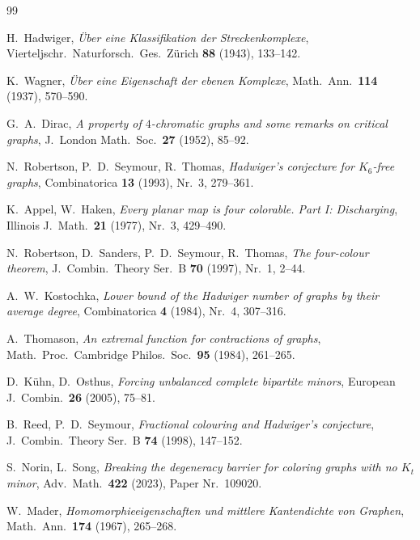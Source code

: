 \documentclass[12pt,a4paper]{amsart}
\theoremstyle{definition}
\theoremstyle{remark}
\begin{document}
\begin{thebibliography}{99}

H.~Hadwiger,
\textit{Über eine Klassifikation der Streckenkomplexe},
Vierteljschr.\ Naturforsch.\ Ges.\ Zürich \textbf{88} (1943), 133--142.

K.~Wagner,
\textit{Über eine Eigenschaft der ebenen Komplexe},
Math.\ Ann.\ \textbf{114} (1937), 570--590.

G.~A.\ Dirac,
\textit{A property of $4$-chromatic graphs and some remarks on critical graphs},
J.\ London Math.\ Soc.\ \textbf{27} (1952), 85--92.

N.~Robertson, P.~D.\ Seymour, R.~Thomas,
\textit{Hadwiger's conjecture for $K_6$-free graphs},
Combinatorica \textbf{13} (1993), Nr.\ 3, 279--361.

K.~Appel, W.~Haken,
\textit{Every planar map is four colorable. Part I: Discharging},
Illinois J.\ Math.\ \textbf{21} (1977), Nr.\ 3, 429--490.

N.~Robertson, D.~Sanders, P.~D.\ Seymour, R.~Thomas,
\textit{The four-colour theorem},
J.\ Combin.\ Theory Ser.\ B \textbf{70} (1997), Nr.\ 1, 2--44.

A.~W.\ Kostochka,
\textit{Lower bound of the Hadwiger number of graphs by their average degree},
Combinatorica \textbf{4} (1984), Nr.\ 4, 307--316.

A.~Thomason,
\textit{An extremal function for contractions of graphs},
Math.\ Proc.\ Cambridge Philos.\ Soc.\ \textbf{95} (1984), 261--265.

D.~Kühn, D.~Osthus,
\textit{Forcing unbalanced complete bipartite minors},
European J.\ Combin.\ \textbf{26} (2005), 75--81.

B.~Reed, P.~D.\ Seymour,
\textit{Fractional colouring and Hadwiger's conjecture},
J.\ Combin.\ Theory Ser.\ B \textbf{74} (1998), 147--152.

S.~Norin, L.~Song,
\textit{Breaking the degeneracy barrier for coloring graphs with no $K_t$ minor},
Adv.\ Math.\ \textbf{422} (2023), Paper Nr.\ 109020.

W.~Mader,
\textit{Homomorphieeigenschaften und mittlere Kantendichte von Graphen},
Math.\ Ann.\ \textbf{174} (1967), 265--268.

\end{thebibliography}
\end{document}
